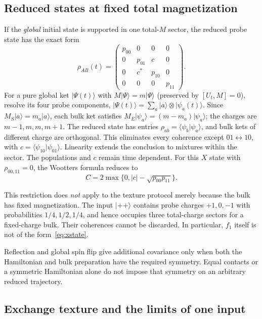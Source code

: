 \documentclass[11pt,a4paper]{article}
\newcommand{\ket}[1]{\lvert #1\rangle}
\begin{document}
\subsection{Reduced states at fixed total magnetization}
\label{sec:xstate}

If the \emph{global} initial state is supported in one total-$M$ sector,
the reduced probe state has the exact form
\begin{equation}
 \rho_{AB}(t)=\begin{pmatrix}
 p_{00}&0&0&0\\0&p_{01}&c&0\\0&c^*&p_{10}&0\\0&0&0&p_{11}
 \end{pmatrix}.
 \label{eq:xstate}
\end{equation}
For a pure global ket $\ket{\Psi(t)}$ with $M\ket\Psi=m\ket\Psi$ (preserved
by $[U_t,M]=0$), resolve its four probe components,
$\ket{\Psi(t)}=\sum_a\ket a\otimes\ket{\psi_a(t)}$. Since $M_S\ket a=m_a\ket a$,
each bulk ket satisfies $M_E\ket{\psi_a}=(m-m_a)\ket{\psi_a}$; the charges are
$m-1,m,m,m+1$. The reduced state has entries
$\rho_{ab}=\langle\psi_b|\psi_a\rangle$, and bulk kets of different charge are
orthogonal. This eliminates every coherence except $01\leftrightarrow10$,
with $c=\langle\psi_{10}|\psi_{01}\rangle$. Linearity extends the conclusion
to mixtures within the sector.
The populations and $c$ remain time dependent. For this $X$ state with
$\rho_{00,11}=0$, the Wootters formula reduces to
\begin{equation}
 C=2\max\{0,|c|-\sqrt{p_{00}p_{11}}\}.
\end{equation}

This restriction does \emph{not} apply to the texture protocol merely
because the bulk has fixed magnetization. The input $\ket{++}$ contains
probe charges $+1,0,-1$ with probabilities $1/4,1/2,1/4$, and hence
occupies three total-charge sectors for a fixed-charge bulk. Their
coherences cannot be discarded. In particular, $f_1$ itself is not
of the form~\eqref{eq:xstate}.

Reflection and global spin flip give additional covariance only when
both the Hamiltonian and bulk preparation have the required symmetry.
Equal contacts or a symmetric Hamiltonian alone do not impose that
symmetry on an arbitrary reduced trajectory.

\subsection{Exchange texture and the limits of one input}
\label{sec:extexture}
\end{document}

